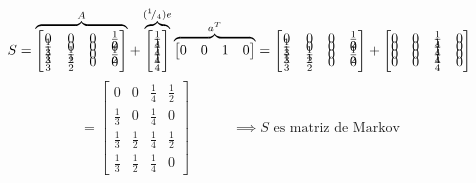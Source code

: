 \begin{align*}
    S =
        \overbrace{
            \begin{bmatrix}
                    0& 0& 0& \frac{1}{2}\\[-0.65em]
                    \frac{1}{3}& 0& 0& 0\\[-0.65em]
                    \frac{1}{3}& \frac{1}{2}& 0& \frac{1}{2}\\[-0.65em]
                    \frac{1}{3}& \frac{1}{2}& 0& 0
            \end{bmatrix}
        }^A
    +
        \overbrace{
            \begin{bmatrix}
                \frac{1}{4}\\[-0.65em]
                \frac{1}{4}\\[-0.65em]
                \frac{1}{4}\\[-0.65em]
                \frac{1}{4}
            \end{bmatrix}
        }^{({}^{1}\!/_{4})e}
        \overbrace{
            \begin{bmatrix}
                0 & 0 & 1 & 0
            \end{bmatrix}
        }^{a^T}
    =
        \begin{bmatrix}
                0& 0& 0& \frac{1}{2}\\[-0.65em]
                \frac{1}{3}& 0& 0& 0\\[-0.65em]
                \frac{1}{3}& \frac{1}{2}& 0& \frac{1}{2}\\[-0.65em]
                \frac{1}{3}& \frac{1}{2}& 0& 0
        \end{bmatrix}
        +
        \begin{bmatrix}
            0&0&\frac{1}{4}&0\\[-0.65em]
            0&0&\frac{1}{4}&0\\[-0.65em]
            0&0&\frac{1}{4}&0\\[-0.65em]
            0&0&\frac{1}{4}&0
        \end{bmatrix}
\end{align*}
\medskip\medskip\medskip
\begin{equation}
    =
        \begin{bmatrix}
            0& 0& \frac{1}{4}& \frac{1}{2}\\[-0.65em]
            \frac{1}{3}& 0& \frac{1}{4}& 0\\[-0.65em]
            \frac{1}{3}& \frac{1}{2}& \frac{1}{4}& \frac{1}{2}\\[-0.65em]
            \frac{1}{3}& \frac{1}{2}& \frac{1}{4}& 0
        \end{bmatrix}
    \quad\quad\quad\implies\text{$S$ es matriz de Markov}
\end{equation}
\medskip


